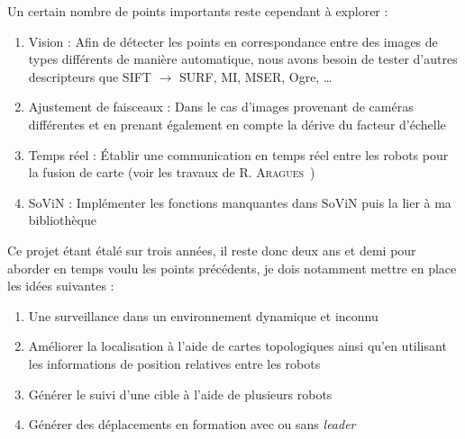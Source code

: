 Un certain nombre de points importants reste cependant à explorer :
\begin{enumerate}
\item Vision : Afin de détecter les points en correspondance entre des images de types différents de manière automatique, nous avons besoin de tester d'autres descripteurs que SIFT $\rightarrow$ SURF, MI, MSER, Ogre, \dots
\item Ajustement de faisceaux : Dans le cas d'images provenant de caméras différentes et en prenant également en compte la dérive du facteur d'échelle
\item Temps réel : Établir une communication en temps réel entre les robots pour la fusion de carte (voir les travaux de R. \textsc{Aragues}~\cite{Aragues11PhD})
\item SoViN : Implémenter les fonctions manquantes dans SoViN puis la lier à ma bibliothèque 
\end{enumerate}

Ce projet étant étalé sur trois années, il reste donc deux ans et demi pour aborder en temps voulu les points précédents, je dois notamment mettre en place les idées suivantes :
\begin{enumerate}
\item Une surveillance dans un environnement dynamique et inconnu
\item Améliorer la localisation à l'aide de cartes topologiques ainsi qu'en utilisant les informations de position relatives entre les robots
\item Générer le suivi d'une cible à l'aide de plusieurs robots
\item Générer des déplacements en formation avec ou sans \emph{leader}
\end{enumerate}

